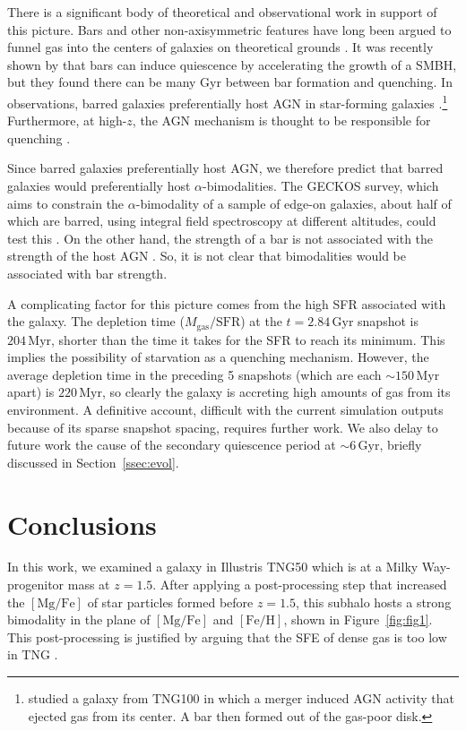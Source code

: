 \documentclass[twocolumn]{aastex631}
\newcommand{\Gyr}{\ensuremath{\textrm{Gyr}}}
\newcommand{\Myr}{\ensuremath{\textrm{Myr}}}
\newcommand{\FeH}{\ensuremath{[\textrm{Fe}/\textrm{H}]}}
\newcommand{\MgFe}{\ensuremath{[\textrm{Mg}/\textrm{Fe}]}}
\begin{document}
There is a significant body of theoretical and observational work in support of this picture. Bars and other non-axisymmetric features have long been argued to funnel gas into the centers of galaxies on theoretical grounds \citep{1989Natur.338...45S,2010MNRAS.407.1529H}. It was recently shown by \citet{2024arXiv240906783F} that bars can induce quiescence by accelerating the growth of a SMBH, but they found there can be many Gyr between bar formation and quenching. In observations, barred galaxies preferentially host AGN in star-forming galaxies \citep{2012ApJS..198....4O,2022A&A...661A.105S}.\footnote{\citet{2022A&A...668L...3L} studied a galaxy from TNG100 in which a merger induced AGN activity that ejected gas from its center. A bar then formed out of the gas-poor disk.} Furthermore, at high-$z$, the AGN mechanism is thought to be responsible for quenching \citep[e.g.][and references therein]{2023arXiv230806317D,2024arXiv240417945P,2024ApJ...968L..21M,2024Natur.630...54B}.

Since barred galaxies preferentially host AGN, we therefore predict that barred galaxies would preferentially host $\alpha$-bimodalities. The GECKOS survey, which aims to constrain the $\alpha$-bimodality of a sample of edge-on galaxies, about half of which are barred, using integral field spectroscopy at different altitudes, could test this \citep[and J. v.~d.~Sande, private communication]{2024IAUS..377...27V}. On the other hand, the strength of a bar is not associated with the strength of the host AGN \citep[e.g.]{2022A&A...661A.105S}. So, it is not clear that bimodalities would be associated with bar strength.

A complicating factor for this picture comes from the high SFR associated with the galaxy. The depletion time ($M_{\textrm{gas}}/\textrm{SFR}$) at the $t=2.84\,\Gyr$ snapshot is $204\,\Myr$, shorter than the time it takes for the SFR to reach its minimum. This implies the possibility of starvation as a quenching mechanism. However, the average depletion time in the preceding 5 snapshots (which are each $\sim150\,\Myr$ apart) is $220\,\Myr$, so clearly the galaxy is accreting high amounts of gas from its environment. A definitive account, difficult with the current simulation outputs because of its sparse snapshot spacing, requires further work. We also delay to future work the cause of the secondary quiescence period at $\sim6\,\Gyr$, briefly discussed in Section~\ref{ssec:evol}.

\section{Conclusions}\label{sec:conc}
In this work, we examined a galaxy in Illustris TNG50 which is at a Milky Way-progenitor mass at $z=1.5$. After applying a post-processing step that increased the \MgFe{} of star particles formed before $z=1.5$, this subhalo hosts a strong bimodality in the plane of \MgFe{} and \FeH{}, shown in Figure~\ref{fig:fig1}. This post-processing is justified by arguing that the SFE of dense gas is too low in TNG \citep[][see discussion in our Section~\ref{ssec:sfe}]{2024arXiv240909121H}.
\end{document}
